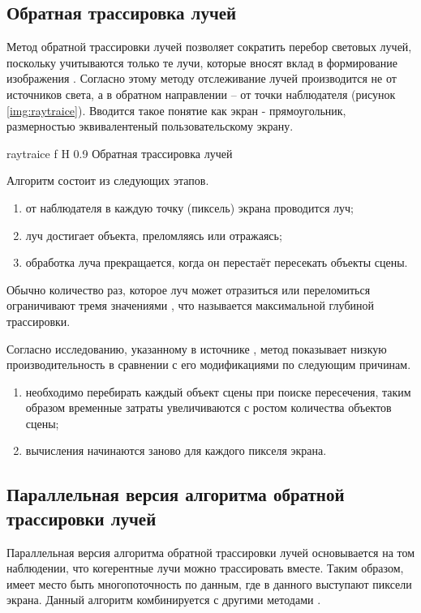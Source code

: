 \subsection{Обратная трассировка лучей}

Метод обратной трассировки лучей позволяет сократить перебор световых лучей, поскольку учитываются только те лучи, которые вносят вклад в формирование изображения \cite{kgtomsk}. 
Согласно этому методу отслеживание лучей производится не от источников света, а в обратном направлении – от точки наблюдателя (рисунок \ref{img:raytraice}). Вводится такое понятие как экран - прямоугольник, размерностью эквивалентеный пользовательскому экрану.

{raytraice}
{f}
{H}
{0.9\textwidth}
{Обратная трассировка лучей}

Алгоритм состоит из следующих этапов.
\begin{enumerate}
	\item от наблюдателя в каждую точку (пиксель) экрана проводится луч;
	\item луч достигает объекта, преломляясь или отражаясь; 
	\item обработка луча прекращается, когда он перестаёт пересекать объекты сцены. 
\end{enumerate}

Обычно количество раз, которое луч может отразиться или переломиться ограничивают тремя значениями \cite{kgtomsk}, что называется максимальной глубиной трассировки.

Согласно исследованию, указанному в источнике \cite{rtresearch}, метод показывает низкую производительность в сравнении с его модификациями по следующим причинам.

\begin{enumerate}
	\item необходимо перебирать каждый объект сцены при поиске пересечения, таким образом временные затраты увеличиваются с ростом количества объектов сцены;
	\item вычисления начинаются заново для каждого пикселя экрана. 
\end{enumerate}

\subsection{Параллельная версия алгоритма обратной трассировки лучей}

Параллельная версия алгоритма обратной трассировки лучей основывается на том наблюдении, что когерентные лучи можно трассировать вместе. Таким образом, имеет место быть многопоточность по данным, где в данного выступают пиксели экрана. Данный алгоритм комбинируется с другими методами \cite{raytraicecompare}.

